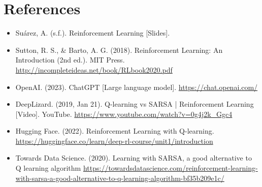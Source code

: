 \documentclass[11pt,a4paper]{article}
\begin{document}
\section{References}
\begin{itemize}
    \item Suárez, A. (s.f.). Reinforcement Learning [Slides].
    \item Sutton, R. S., \& Barto, A. G. (2018). Reinforcement Learning: An Introduction (2nd ed.). MIT Press. \url{http://incompleteideas.net/book/RLbook2020.pdf}
    \item OpenAI. (2023). ChatGPT [Large language model]. \url{https://chat.openai.com/}
    \item DeepLizard. (2019, Jan 21). Q-learning vs SARSA | Reinforcement Learning [Video]. YouTube. \url{https://www.youtube.com/watch?v=0g4j2k_Ggc4}
    \item Hugging Face. (2022). Reinforcement Learning with Q-learning. \url{https://huggingface.co/learn/deep-rl-course/unit1/introduction}
    \item Towards Data Science. (2020). Learning with SARSA, a good alternative to Q learning algorithm \url{https://towardsdatascience.com/reinforcement-learning-with-sarsa-a-good-alternative-to-q-learning-algorithm-bf35b209e1c/}
\end{itemize}
\end{document}
